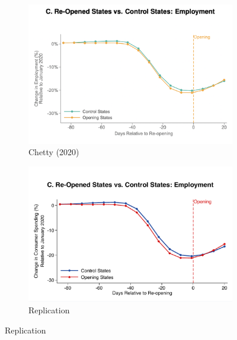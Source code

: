 \documentclass[12pt,letterpaper]{article}
\begin{document}
\begin{figure}
    \centering
    \caption{}
    \begin{subfigure}[t]{0.8\textwidth}
        \centering
        \includegraphics[width=\linewidth]{ChettyEmploymentGraph.png} 
        \caption{Chetty (2020)} 
        \label{fig:empC}
    \end{subfigure}

    \begin{subfigure}[t]{0.8\textwidth}
        \centering
        \includegraphics[width=\linewidth]{EmploymentGraph.pdf} 
        \caption{Replication} 
        \label{fig:emp}
    \end{subfigure}
\end{figure}

\clearpage
\end{document}
